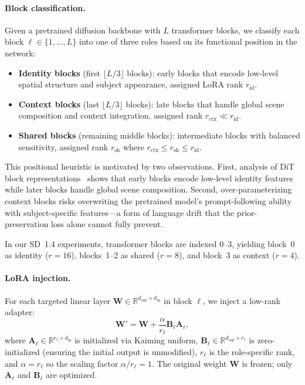 \documentclass{article}
\begin{document}
\paragraph{Block classification.}
Given a pretrained diffusion backbone with $L$ transformer blocks, we classify each block $\ell \in \{1, \ldots, L\}$ into one of three roles based on its functional position in the network:
\begin{itemize}
    \item \textbf{Identity blocks} (first $\lfloor L/3 \rfloor$ blocks): early blocks that encode low-level spatial structure and subject appearance, assigned LoRA rank $r_{\text{id}}$.
    \item \textbf{Context blocks} (last $\lfloor L/3 \rfloor$ blocks): late blocks that handle global scene composition and context integration, assigned rank $r_{\text{ctx}} \ll r_{\text{id}}$.
    \item \textbf{Shared blocks} (remaining middle blocks): intermediate blocks with balanced sensitivity, assigned rank $r_{\text{sh}}$ where $r_{\text{ctx}} \leq r_{\text{sh}} \leq r_{\text{id}}$.
\end{itemize}

This positional heuristic is motivated by two observations.
First, analysis of DiT block representations~\citep{zhu2025blocklora} shows that early blocks encode low-level identity features while later blocks handle global scene composition.
Second, over-parameterizing context blocks risks overwriting the pretrained model's prompt-following ability with subject-specific features---a form of language drift that the prior-preservation loss alone cannot fully prevent.

In our SD~1.4 experiments, transformer blocks are indexed 0--3, yielding block~0 as identity ($r{=}16$), blocks~1--2 as shared ($r{=}8$), and block~3 as context ($r{=}4$).

\paragraph{LoRA injection.}
For each targeted linear layer $\mathbf{W} \in \mathbb{R}^{d_{\text{out}} \times d_{\text{in}}}$ in block $\ell$, we inject a low-rank adapter:
\begin{equation}
    \mathbf{W}' = \mathbf{W} + \frac{\alpha}{r_\ell} \mathbf{B}_\ell \mathbf{A}_\ell,
    \label{eq:lora}
\end{equation}
where $\mathbf{A}_\ell \in \mathbb{R}^{r_\ell \times d_{\text{in}}}$ is initialized via Kaiming uniform, $\mathbf{B}_\ell \in \mathbb{R}^{d_{\text{out}} \times r_\ell}$ is zero-initialized (ensuring the initial output is unmodified), $r_\ell$ is the role-specific rank, and $\alpha = r_\ell$ so the scaling factor $\alpha / r_\ell = 1$.
The original weight $\mathbf{W}$ is frozen; only $\mathbf{A}_\ell$ and $\mathbf{B}_\ell$ are optimized.
\end{document}
